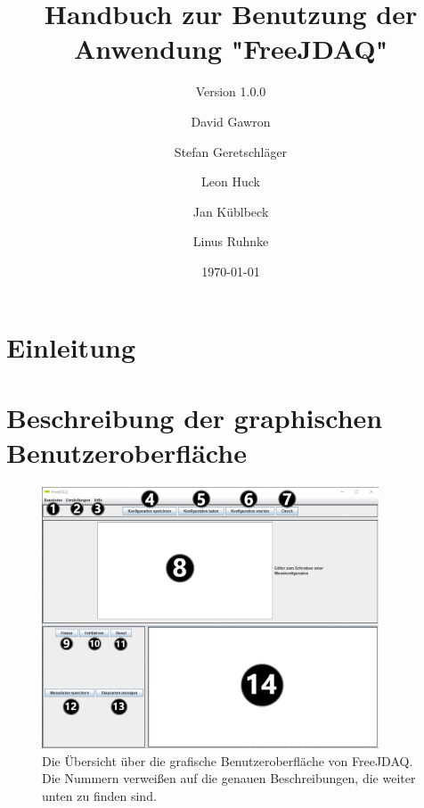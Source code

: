 \documentclass[parskip=full]{scrartcl}
\title{Handbuch zur Benutzung der Anwendung "FreeJDAQ"}
\subtitle{Version 1.0.0}
\author{David Gawron \and Stefan Geretschläger \and Leon Huck \and Jan Küblbeck \and Linus Ruhnke}
\date{\today}
\begin{document}
\maketitle

\clearpage
\tableofcontents 					%

\section{Einleitung}

\section{Beschreibung der graphischen Benutzeroberfläche}

\begin{figure}[htbp]
    \begin{center}
        \includegraphics[width = 10cm]{Grafiken/Uebersicht_GUI_Mit_Nummern.png}
        \caption{Die Übersicht über die grafische Benutzeroberfläche von FreeJDAQ. Die Nummern verweißen auf die genauen Beschreibungen, die weiter unten zu finden sind.}
        \label{Uebersicht_GUI_Mit_Nummern}
    \end{center}
\end{figure}
\end{document}
